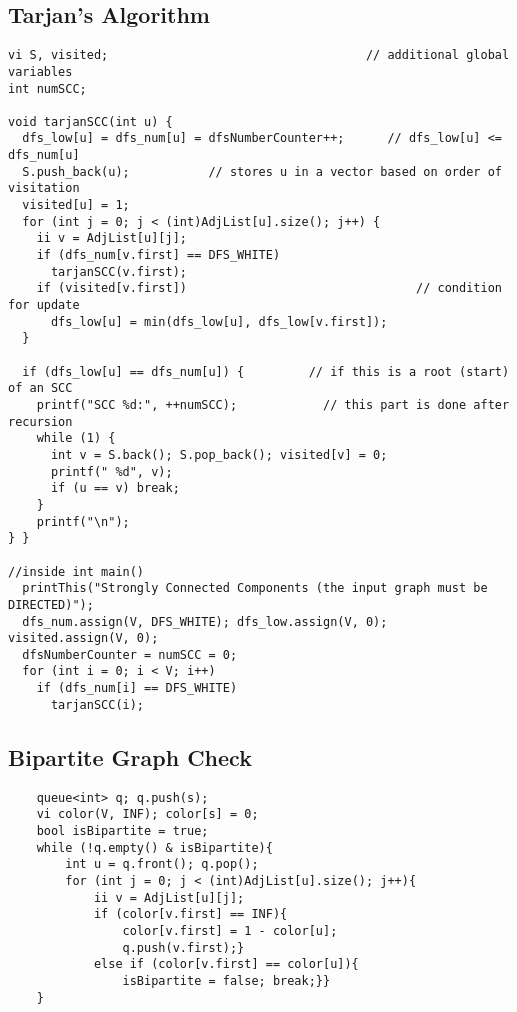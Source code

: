 \documentclass[letterpaper]{article}
\begin{document}
\subsection{Tarjan's Algorithm}
\begin{lstlisting}
vi S, visited;                                    // additional global variables
int numSCC;

void tarjanSCC(int u) {
  dfs_low[u] = dfs_num[u] = dfsNumberCounter++;      // dfs_low[u] <= dfs_num[u]
  S.push_back(u);           // stores u in a vector based on order of visitation
  visited[u] = 1;
  for (int j = 0; j < (int)AdjList[u].size(); j++) {
    ii v = AdjList[u][j];
    if (dfs_num[v.first] == DFS_WHITE)
      tarjanSCC(v.first);
    if (visited[v.first])                                // condition for update
      dfs_low[u] = min(dfs_low[u], dfs_low[v.first]);
  }

  if (dfs_low[u] == dfs_num[u]) {         // if this is a root (start) of an SCC
    printf("SCC %d:", ++numSCC);            // this part is done after recursion
    while (1) {
      int v = S.back(); S.pop_back(); visited[v] = 0;
      printf(" %d", v);
      if (u == v) break;
    }
    printf("\n");
} }

//inside int main()
  printThis("Strongly Connected Components (the input graph must be DIRECTED)");
  dfs_num.assign(V, DFS_WHITE); dfs_low.assign(V, 0); visited.assign(V, 0);
  dfsNumberCounter = numSCC = 0;
  for (int i = 0; i < V; i++)
    if (dfs_num[i] == DFS_WHITE)
      tarjanSCC(i);
\end{lstlisting}

\subsection{Bipartite Graph Check}
\begin{lstlisting}
	queue<int> q; q.push(s);
	vi color(V, INF); color[s] = 0;
	bool isBipartite = true;
	while (!q.empty() & isBipartite){
		int u = q.front(); q.pop();
		for (int j = 0; j < (int)AdjList[u].size(); j++){
			ii v = AdjList[u][j];
			if (color[v.first] == INF){
				color[v.first] = 1 - color[u];
				q.push(v.first);}
			else if (color[v.first] == color[u]){
				isBipartite = false; break;}}
	}
\end{lstlisting}
\end{document}
